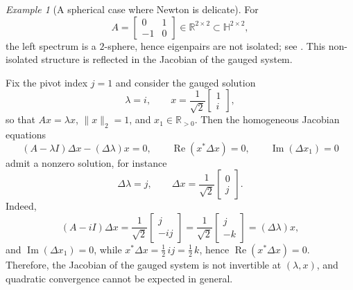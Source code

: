 \documentclass[preprint,12pt]{elsarticle}  %
\theoremstyle{definition}
\theoremstyle{definition}
\theoremstyle{definition}
\theoremstyle{definition}
\theoremstyle{definition}
\theoremstyle{remark}
\theoremstyle{remark}
\newtheorem{Ex}{Example}
\theoremstyle{remark}
\DeclareRobustCommand{\i}{\ensuremath{\mathbf{i}}}
\DeclareRobustCommand{\j}{\ensuremath{\mathbf{j}}}
\DeclareRobustCommand{\k}{\ensuremath{\mathbf{k}}}
\def\i{i}\def\j{j}\def\k{k}%
\renewcommand{\Re}{\operatorname{Re}}
\renewcommand{\Im}{\operatorname{Im}}
\newcommand{\RR}{\mathbb{R}}
\newcommand{\HH}{\mathbb{H}}
\begin{document}
\begin{Ex}[A spherical case where Newton is delicate]
\label{ex_newton_spherical_warning}
For
\[
A=\begin{bmatrix}0&1\\ -1&0\end{bmatrix}\in\RR^{2\times2}\subset\HH^{2\times2},
\]
the left spectrum is a $2$-sphere, hence eigenpairs are not isolated; see \cite{HuangSo2001}.
This non-isolated structure is reflected in the Jacobian of the gauged system.

Fix the pivot index $j=1$ and consider the gauged solution
\[
\lambda=\i,\qquad x=\frac1{\sqrt2}\begin{bmatrix}1\\ \i\end{bmatrix},
\]
so that $Ax=\lambda x$, $\|x\|_2=1$, and $x_1\in\RR_{>0}$.
Then the homogeneous Jacobian equations
\[
(A-\lambda I)\Delta x-(\Delta\lambda)x=0,\qquad
\Re(x^\ast\Delta x)=0,\qquad
\Im(\Delta x_1)=0
\]
admit a nonzero solution, for instance
\[
\Delta\lambda=\j,\qquad
\Delta x=\frac1{\sqrt2}\begin{bmatrix}0\\ \j\end{bmatrix}.
\]
Indeed,
\[
(A-\i I)\Delta x
=\frac1{\sqrt2}\begin{bmatrix}\j\\ -\i\j\end{bmatrix}
=\frac1{\sqrt2}\begin{bmatrix}\j\\ -\k\end{bmatrix}
=(\Delta\lambda)x,
\]
and $\Im(\Delta x_1)=0$, while $x^\ast\Delta x=\tfrac12\,\i\j=\tfrac12\,\k$, hence $\Re(x^\ast\Delta x)=0$.
Therefore, the Jacobian of the gauged system is not invertible at $(\lambda,x)$, and quadratic convergence cannot be
expected in general.
\end{Ex}

\end{document}

